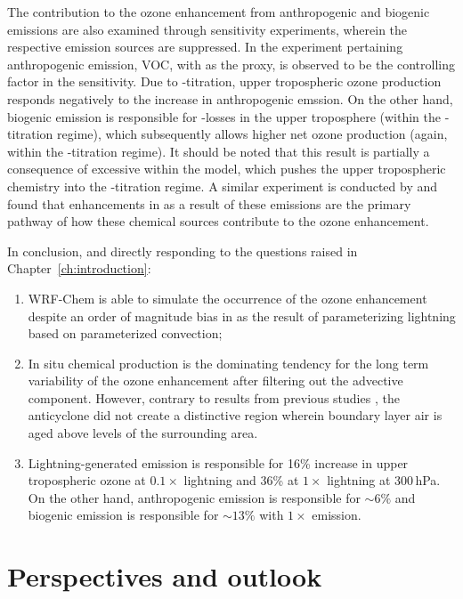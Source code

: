 The contribution to the ozone enhancement from anthropogenic and biogenic emissions are also examined
through sensitivity experiments, wherein the respective emission sources are suppressed. In the
experiment pertaining anthropogenic emission, VOC, with  as the proxy, is observed
to be the controlling factor in the sensitivity. Due to -titration, upper tropospheric
ozone production responds negatively to the increase in anthropogenic emssion. On the other hand, biogenic
emission is responsible for -losses in the upper troposphere (within the
-titration regime), which subsequently allows higher net ozone production (again,
within the -titration regime). It should be noted that this result is partially a consequence
of excessive {\lnox} within the model, which pushes the upper tropospheric chemistry into the -titration
regime. A similar experiment is conducted by \citet{Li:2005ss} and found that enhancements in  as a result of
these emissions are the primary pathway of how these chemical sources contribute to the ozone enhancement.

In conclusion, and directly responding to the questions raised in Chapter~\ref{ch:introduction}:
\begin{enumerate}
	\item WRF-Chem is able to simulate the occurrence of the ozone enhancement despite an
	order of magnitude bias in  as the result of parameterizing lightning based on
	parameterized convection;
	\item In situ chemical production is the dominating tendency for the long term variability of
	the ozone enhancement after filtering out the advective component. However, contrary to
	results from previous studies \citep[e.g.][]{Li:2005ss,Cooper:2007cr,Barth:2012qf}, the
	anticyclone did not create a distinctive region wherein boundary layer air is aged above
	levels of the surrounding area.
	\item Lightning-generated  emission is responsible for 16\% increase in upper
	tropospheric ozone at $0.1\times$ lightning and 36\% at $1\times$ lightning at 300\,\unit{hPa}.
	On the other hand, anthropogenic emission is responsible for $\sim6\%$ and biogenic
	emission is responsible for $\sim13\%$ with $1\times$ {\lnox} emission.
\end{enumerate}

\section{Perspectives and outlook}

